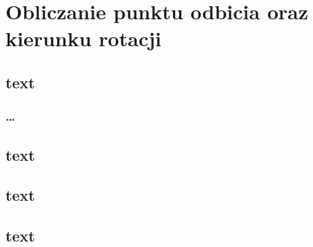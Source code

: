 \chapter{Obliczanie punktu odbicia oraz kierunku rotacji}
\label{t:int}

\section{text}
\label{t:int:stateofart}

	\subsection{\dots}

\section{text}

\section{text}

\section{text}